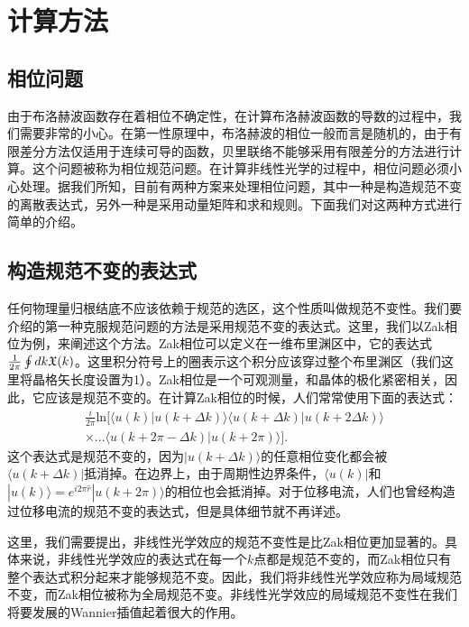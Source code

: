 \section{计算方法}
\subsection{相位问题}

由于布洛赫波函数存在着相位不确定性，在计算布洛赫波函数的导数的过程中，我们需要非常的小心。在第一性原理中，布洛赫波的相位一般而言是随机的，由于有限差分方法仅适用于连续可导的函数，贝里联络不能够采用有限差分的方法进行计算。这个问题被称为相位规范问题。在计算非线性光学的过程中，相位问题必须小心处理。据我们所知，目前有两种方案来处理相位问题，其中一种是构造规范不变的离散表达式，另外一种是采用动量矩阵和求和规则。下面我们对这两种方式进行简单的介绍。


\subsection{构造规范不变的表达式}

任何物理量归根结底不应该依赖于规范的选区，这个性质叫做规范不变性。我们要介绍的第一种克服规范问题的方法是采用规范不变的表达式。这里，我们以Zak相位\cite{zak_berrys_1989}为例，来阐述这个方法。Zak相位可以定义在一维布里渊区中，它的表达式$\frac{1}{2\pi}\ointop dk\berry(k)$。这里积分符号上的圈表示这个积分应该穿过整个布里渊区（我们这里将晶格矢长度设置为1）。Zak相位是一个可观测量，和晶体的极化紧密相关\cite{king-smith_theory_1993,resta_theory_1992}，因此，它应该是规范不变的。在计算Zak相位的时候，人们常常使用下面的表达式：
\begin{align*}
\frac{i}{2\pi}\text{ln}[\langle u(k)|u(k+\Delta k)\rangle\langle u(k+\Delta k)|u(k+2\Delta k)\rangle\\
\times...\langle u(k+2\pi-\Delta k)|u(k+2\pi)\rangle].
\end{align*}
这个表达式是规范不变的，因为$|u(k+\Delta k)\rangle$的任意相位变化都会被$\langle u(k+\Delta k)|$抵消掉。在边界上，由于周期性边界条件，$\langle u(k)|$和$|u(k)\rangle=e^{i2\pi\hat{r}}|u(k+2\pi)\rangle$的相位也会抵消掉。对于位移电流，人们也曾经构造过位移电流的规范不变的表达式\cite{young2012}，但是具体细节就不再详述。


这里，我们需要提出，非线性光学效应的规范不变性是比Zak相位更加显著的。具体来说，非线性光学效应的表达式在每一个$k$点都是规范不变的，而Zak相位只有整个表达式积分起来才能够规范不变。因此，我们将非线性光学效应称为局域规范不变，而Zak相位被称为全局规范不变。非线性光学效应的局域规范不变性在我们将要发展的Wannier插值起着很大的作用。

